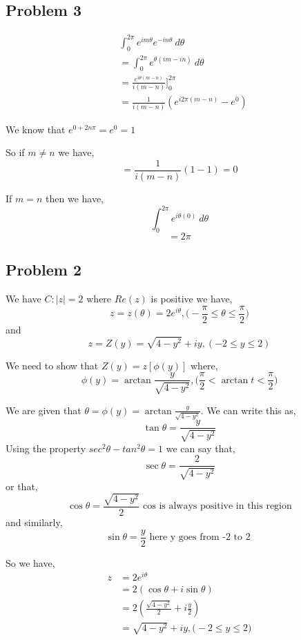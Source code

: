 \documentclass[a4paper]{report}
\begin{document}
\subsection*{Problem 3}

\begin{align*}
&\int_{{0}}^{{2\pi}} {e^{im\theta}e^{-in\theta}} \: d{\theta} {}\\
&=\int_{{0}}^{{2\pi}} {e^{\theta(im - in)}} \: d{\theta} {}\\
&=\frac{e^{i\theta(m - n)}}{i(m - n)}]_0^{2\pi}\\
&=\frac{1}{i(m-n)} (e^{i2\pi(m-n)} - e^{0})
\end{align*}

We know that $e^{0 + 2n\pi} = e^{0} = 1$

So if $m \ne n$ we have, 
$$ = \frac{1}{i(m-n)} (1 - 1) = 0 $$ 

If $m = n$ then we have, 
$$ \int_{{0}}^{{2\pi}} {e^{i\theta(0)}} \: d{\theta} {} $$ 
$$ =2\pi $$ 


\subsection*{Problem 2}
We have $C : |z| = 2$ where $Re(z)$ is positive we have, 
$$ z= z(\theta) = 2e^{i\theta}, \bigg ( -\frac{\pi}{2} \le \theta \le \frac{\pi}{2} \bigg) $$  and 
$$ z = Z(y) = \sqrt{4 - y^2} + iy, (-2 \le y \le 2) $$ 

We need to show that $Z(y) = z[\phi(y)]$ where, 
$$ \phi(y) = \arctan \frac{y}{\sqrt{4 - y^2}}, \bigg( \frac{\pi}{2} < \arctan t < \frac{\pi}{2}\bigg)$$ 


We are given that $\theta = \phi(y) = \arctan \frac{y}{\sqrt{4 - y^2}}$. We can write this as, 
$$ \tan \theta  = \frac{y}{\sqrt{4 - y^2}}$$ 
Using the property $sec^2 \theta - tan^2 \theta = 1$ we can say that, 
$$ \sec \theta = \frac{2}{\sqrt{4 - y^2}} $$  or that, 
$$ \cos \theta = \frac{\sqrt{4 - y^2}}{2}\text{ cos is always positive in this region} $$  and similarly, 
$$ \sin \theta = \frac{y}{2} \text{ here y goes from -2 to 2 }$$ 

So we have, 
\begin{align*}
    z &= 2e^{i\theta}\\
      &= 2(\cos \theta + i \sin \theta)\\
      &= 2(\frac{\sqrt{4 - y^2}}{2} + i \frac{y}{2})\\
      &= \sqrt{4 - y^2} + iy, \bigg( -2 \le y \le 2 \bigg)
\end{align*}
\end{document}
